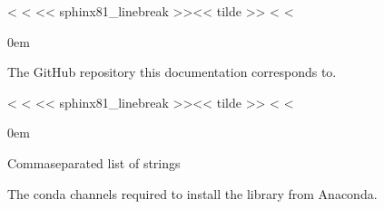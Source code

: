 \documentclass[letterpaper,10pt,english]{sphinxmanual}
\begin{document}

\vspace{5px}

\begin{fulllineitems}
\label{\detokenize{confval:confval-github_repository}}
<%
\pysigstartsignatures
<%
\pysigline<< sphinx81_linebreak >>{}<< tilde >>
<%
<%
\vspace{-30px}

\begin{DUlineblock}{0em}
\item[]  
\item[]  
\end{DUlineblock}

\vspace{-25px}

The GitHub repository this documentation corresponds to.

\end{fulllineitems}


\vspace{5px}

\begin{fulllineitems}
\label{\detokenize{confval:confval-conda_channels}}
<%
\pysigstartsignatures
<%
\pysigline<< sphinx81_linebreak >>{}<< tilde >>
<%
<%
\vspace{-30px}

\begin{DUlineblock}{0em}
\item[]  Comma\sphinxhyphen{}separated list of strings
\item[]  
\end{DUlineblock}

\vspace{-25px}

The conda channels required to install the library from Anaconda.

\end{fulllineitems}
\end{document}
